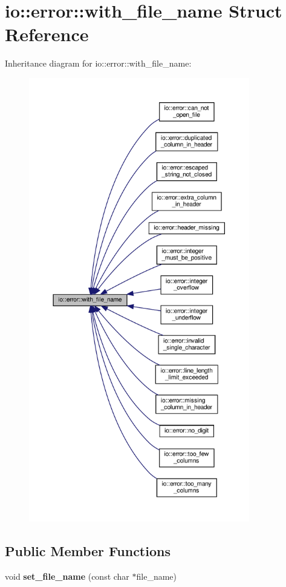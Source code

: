 \hypertarget{structio_1_1error_1_1with__file__name}{}\section{io\+:\+:error\+:\+:with\+\_\+file\+\_\+name Struct Reference}
\label{structio_1_1error_1_1with__file__name}


Inheritance diagram for io\+:\+:error\+:\+:with\+\_\+file\+\_\+name\+:\nopagebreak
\begin{figure}[H]
\begin{center}
\leavevmode
\includegraphics[height=550pt]{structio_1_1error_1_1with__file__name__inherit__graph}
\end{center}
\end{figure}
\subsection*{Public Member Functions}
\begin{DoxyCompactItemize}
\item 
\mbox{\label{structio_1_1error_1_1with__file__name_ae765de62778c989d4658b4efe2995390}} 
void {\bfseries set\+\_\+file\+\_\+name} (const char $\ast$file\+\_\+name)
\end{DoxyCompactItemize}
